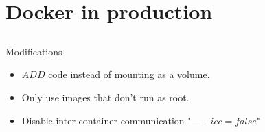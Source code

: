 \documentclass{beamer}
\begin{document}
    \section{Docker in production}
    \subsection{}
    \begin{frame}{Modifications}
        \begin{itemize}
            \item $ADD$ code instead of mounting as a volume.
            \item Only use images that don't run as root.
            \item Disable inter container communication "$--icc=false$"
        \end{itemize}
    \end{frame}
\end{document}
